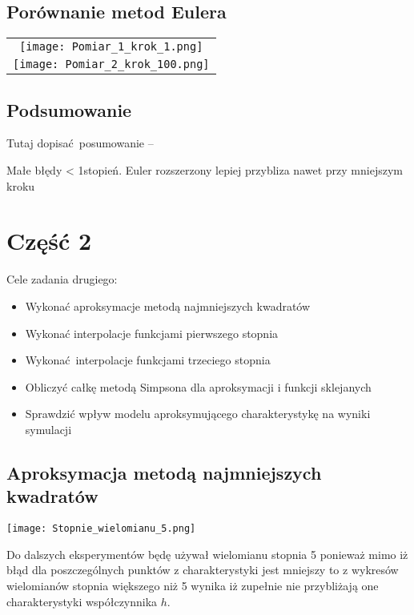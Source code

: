 \documentclass[varwidth,12pt,a4paper]{article}
\begin{document}
\subsection{Porównanie metod Eulera}

\begin{tabular}{c}
    \texttt{[image: Pomiar\_1\_krok\_1.png]} \\
    \texttt{[image: Pomiar\_2\_krok\_100.png]} 
\end{tabular}

\subsection{Podsumowanie}

Tutaj dopisać posumowanie --

Małe błędy < 1stopień.
Euler rozszerzony lepiej przybliza nawet przy mniejszym kroku

\section{Część 2}

Cele zadania drugiego:

\begin{itemize}
  \item Wykonać aproksymacje metodą najmniejszych kwadratów
  \item Wykonać interpolacje funkcjami pierwszego stopnia
  \item Wykonać interpolacje funkcjami trzeciego stopnia
  \item Obliczyć całkę metodą Simpsona dla aproksymacji i funkcji sklejanych
  \item Sprawdzić wpływ modelu aproksymującego charakterystykę na wyniki symulacji
\end{itemize}

\subsection{Aproksymacja metodą najmniejszych kwadratów}

\texttt{[image: Stopnie\_wielomianu\_5.png]} 

Do dalszych eksperymentów będę używał wielomianu stopnia 5 ponieważ 
mimo iż błąd dla poszczególnych punktów z charakterystyki jest mniejszy to 
z wykresów wielomianów stopnia większego niż 5 wynika iż zupełnie nie przybliżają
one charakterystyki współczynnika $h$.
\end{document}
